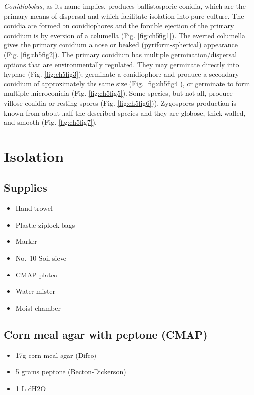 \documentclass[]{book}
\providecommand{\tightlist}{%
  \setlength{\itemsep}{0pt}\setlength{\parskip}{0pt}}
\begin{document}
\emph{Conidiobolus}, as its name implies, produces ballistosporic conidia, which are the primary means of dispersal and which facilitate isolation into pure culture. The conidia are formed on conidiophores and the forcible ejection of the primary conidium is by eversion of a columella (Fig. \ref{fig:ch5fig1}). The everted columella gives the primary conidium a nose or beaked (pyriform-spherical) appearance (Fig. \ref{fig:ch5fig2}). The primary conidium has multiple germination/dispersal options that are environmentally regulated. They may germinate directly into hyphae (Fig. \ref{fig:ch5fig3}); germinate a conidiophore and produce a secondary conidium of approximately the same size (Fig. \ref{fig:ch5fig4}), or germinate to form multiple microconidia (Fig. \ref{fig:ch5fig5}). Some species, but not all, produce villose conidia or resting spores (Fig. \ref{fig:ch5fig6})). Zygospores production is known from about half the described species and they are globose, thick-walled, and smooth (Fig. \ref{fig:ch5fig7}).

\hypertarget{isolation}{%
\section{Isolation}\label{isolation}}

\hypertarget{supplies-1}{%
\subsection{Supplies}\label{supplies-1}}

\begin{itemize}
\tightlist
\item
  Hand trowel
\item
  Plastic ziplock bags
\item
  Marker
\item
  No.~10 Soil sieve
\item
  CMAP plates
\item
  Water mister
\item
  Moist chamber
\end{itemize}

\hypertarget{corn-meal-agar-with-peptone-cmap}{%
\subsection{\texorpdfstring{{Corn meal agar with peptone (CMAP)}}{Corn meal agar with peptone (CMAP)}}\label{corn-meal-agar-with-peptone-cmap}}

\begin{itemize}
\tightlist
\item
  17g corn meal agar (Difco)
\item
  5 grams peptone (Becton-Dickerson)
\item
  1 L dH2O
\end{itemize}
\end{document}

